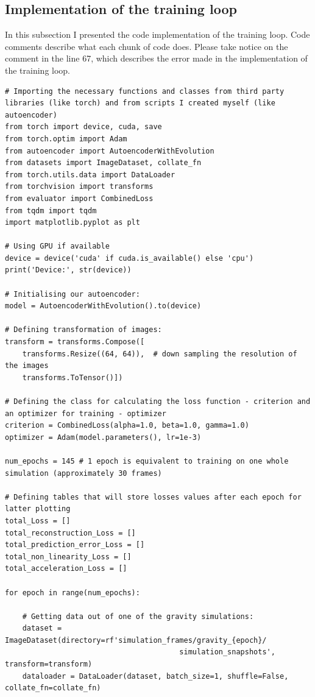 \documentclass[12pt,letterpaper]{article}
\begin{document}
\subsection{Implementation of the training loop}
\label{subs:implement_train_loop}

In this subsection I presented the code implementation of the training loop. Code comments describe what each chunk of code does. Please take notice on the comment in the line 67, which describes the error made in the implementation of the training loop.   
\begin{lstlisting}
# Importing the necessary functions and classes from third party libraries (like torch) and from scripts I created myself (like autoencoder)
from torch import device, cuda, save
from torch.optim import Adam
from autoencoder import AutoencoderWithEvolution
from datasets import ImageDataset, collate_fn
from torch.utils.data import DataLoader
from torchvision import transforms
from evaluator import CombinedLoss
from tqdm import tqdm
import matplotlib.pyplot as plt

# Using GPU if available
device = device('cuda' if cuda.is_available() else 'cpu')
print('Device:', str(device))

# Initialising our autoencoder:
model = AutoencoderWithEvolution().to(device)

# Defining transformation of images:
transform = transforms.Compose([
    transforms.Resize((64, 64)),  # down sampling the resolution of the images
    transforms.ToTensor()])

# Defining the class for calculating the loss function - criterion and an optimizer for training - optimizer
criterion = CombinedLoss(alpha=1.0, beta=1.0, gamma=1.0)
optimizer = Adam(model.parameters(), lr=1e-3)

num_epochs = 145 # 1 epoch is equivalent to training on one whole simulation (approximately 30 frames)

# Defining tables that will store losses values after each epoch for latter plotting
total_Loss = []
total_reconstruction_Loss = []
total_prediction_error_Loss = []
total_non_linearity_Loss = []
total_acceleration_Loss = []

for epoch in range(num_epochs):

    # Getting data out of one of the gravity simulations:
    dataset = ImageDataset(directory=rf'simulation_frames/gravity_{epoch}/
                                        simulation_snapshots', transform=transform)
    dataloader = DataLoader(dataset, batch_size=1, shuffle=False, collate_fn=collate_fn)


\end{lstlisting}
\end{document}
